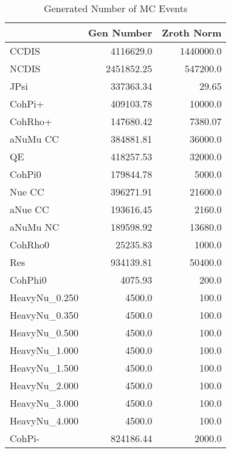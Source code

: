 \documentclass{article}
\begin{document}
\begin{table}[h!]\centering
{\large{
\begin{tabular}{||l|r|r||}
\hline
\hline
      & Gen Number   & Zroth Norm  \\
\hline
 CCDIS   & 4116629.0 & 1440000.0\\
 NCDIS   & 2451852.25 & 547200.0\\
 JPsi    & 337363.34 & 29.65\\
 CohPi+  & 409103.78 & 10000.0\\
 CohRho+ & 147680.42 & 7380.07\\
 aNuMu CC            & 384881.81 & 36000.0\\
 QE      & 418257.53 & 32000.0\\
 CohPi0  & 179844.78 & 5000.0\\
  Nue CC & 396271.91 & 21600.0\\
 aNue CC & 193616.45 & 2160.0\\
 aNuMu NC            & 189598.92 & 13680.0\\
 CohRho0 & 25235.83 & 1000.0\\
 Res     & 934139.81 & 50400.0\\
 CohPhi0 & 4075.93 & 200.0\\
 HeavyNu\_0.250       & 4500.0 & 100.0\\
 HeavyNu\_0.350       & 4500.0 & 100.0\\
 HeavyNu\_0.500       & 4500.0 & 100.0\\
 HeavyNu\_1.000       & 4500.0 & 100.0\\
 HeavyNu\_1.500       & 4500.0 & 100.0\\
 HeavyNu\_2.000       & 4500.0 & 100.0\\
 HeavyNu\_3.000       & 4500.0 & 100.0\\
 HeavyNu\_4.000       & 4500.0 & 100.0\\
 CohPi-  & 824186.44 & 2000.0\\
\hline
\hline
\end{tabular}
\caption{Generated Number of MC Events}
\label{tab-gen-numbers}
}}
\end{table}
\end{document}
